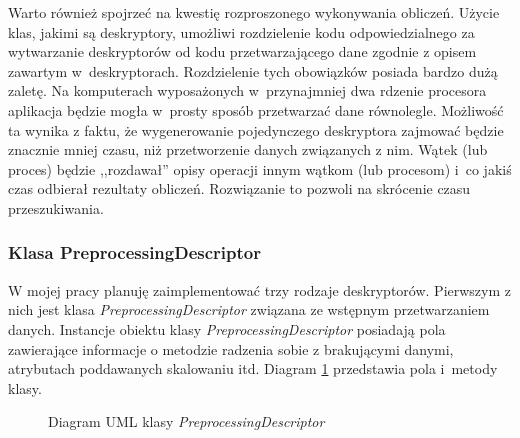 \documentclass[../thesis.tex]{subfiles}
\begin{document}
Warto również spojrzeć na kwestię rozproszonego wykonywania obliczeń. Użycie klas, jakimi są deskryptory, umożliwi rozdzielenie kodu odpowiedzialnego za wytwarzanie deskryptorów od kodu przetwarzającego dane zgodnie z opisem zawartym w~deskryptorach. Rozdzielenie tych obowiązków posiada bardzo dużą zaletę. Na komputerach wyposażonych w~przynajmniej dwa rdzenie procesora aplikacja będzie mogła w~prosty sposób przetwarzać dane równolegle. Możliwość ta wynika z faktu, że wygenerowanie pojedynczego deskryptora zajmować będzie znacznie mniej czasu, niż przetworzenie danych związanych z nim. Wątek (lub proces) będzie ,,rozdawał'' opisy operacji innym wątkom (lub procesom) i~co jakiś czas odbierał rezultaty obliczeń. Rozwiązanie to pozwoli na skrócenie czasu przeszukiwania.

\subsubsection{Klasa PreprocessingDescriptor}

W mojej pracy planuję zaimplementować trzy rodzaje deskryptorów. Pierwszym z nich jest klasa \emph{PreprocessingDescriptor} związana ze wstępnym przetwarzaniem danych. Instancje obiektu klasy \emph{PreprocessingDescriptor} posiadają pola zawierające informacje o metodzie radzenia sobie z brakującymi danymi, atrybutach poddawanych skalowaniu itd. Diagram \ref{proj:diagram_preprocessing_descriptor} przedstawia pola i~metody klasy.

\begin{figure}[h]
\centering
{}
\caption{Diagram UML klasy \emph{PreprocessingDescriptor}}
\label{proj:diagram_preprocessing_descriptor}
\end{figure}
\end{document}
